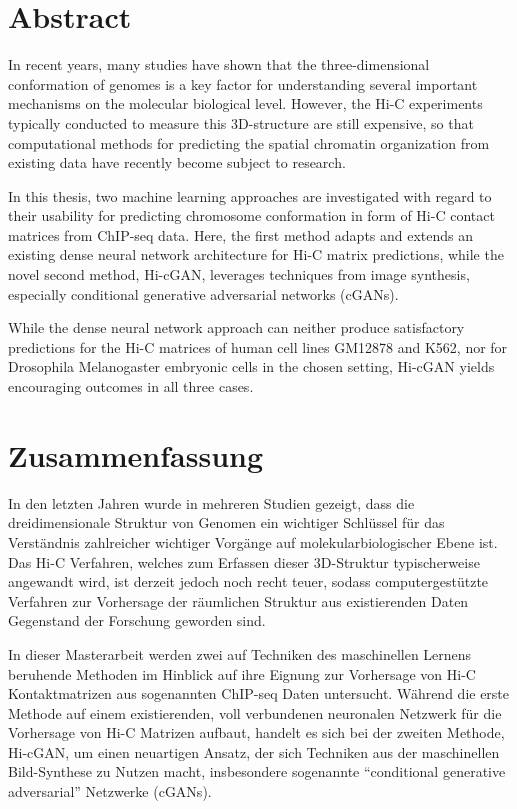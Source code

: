 %
\section*{Abstract}

In recent years, many studies have shown that the three-dimensional conformation of genomes is a key factor
for understanding several important mechanisms on the molecular biological level.
However, the Hi-C experiments typically conducted to measure this 3D-structure are still expensive,
so that computational methods for predicting the spatial chromatin organization from existing data have recently become subject to research. 

In this thesis, two machine learning approaches are investigated with 
regard to their usability for predicting chromosome conformation in form of Hi-C contact matrices from ChIP-seq data.
Here, the first method adapts and extends an existing dense neural network architecture for Hi-C matrix predictions, 
while the novel second method, Hi-cGAN, leverages techniques from image synthesis, especially conditional generative adversarial networks (cGANs).

While the dense neural network approach can neither produce satisfactory predictions for the Hi\hbox{-}C matrices of human cell lines GM12878 and K562,
nor for Drosophila Melanogaster embryonic cells in the chosen setting, Hi-cGAN yields encouraging outcomes in all three cases.


\section*{Zusammenfassung}

In den letzten Jahren wurde in mehreren Studien gezeigt, dass die dreidimensionale Struktur von Genomen ein
wichtiger Schlüssel für das Verständnis zahlreicher wichtiger Vorgänge auf molekularbiologischer Ebene ist.
Das Hi-C Verfahren, welches zum Erfassen dieser 3D-Struktur typischerweise angewandt wird,
ist derzeit jedoch noch recht teuer, sodass computergestützte Verfahren zur Vorhersage 
der räumlichen Struktur aus existierenden Daten Gegenstand der Forschung geworden sind.

In dieser Masterarbeit werden zwei auf Techniken des maschinellen Lernens beruhende Methoden im Hinblick auf ihre Eignung  
zur Vorhersage von Hi-C Kontaktmatrizen aus sogenannten ChIP-seq Daten untersucht.
Während die erste Methode auf einem existierenden, voll verbundenen neuronalen Netzwerk für die Vorhersage von Hi-C Matrizen aufbaut,
handelt es sich bei der zweiten Methode, Hi-cGAN, um einen neuartigen Ansatz, der sich Techniken aus der maschinellen Bild-Synthese zu Nutzen macht,
insbesondere sogenannte ``conditional generative adversarial'' Netzwerke (cGANs).

